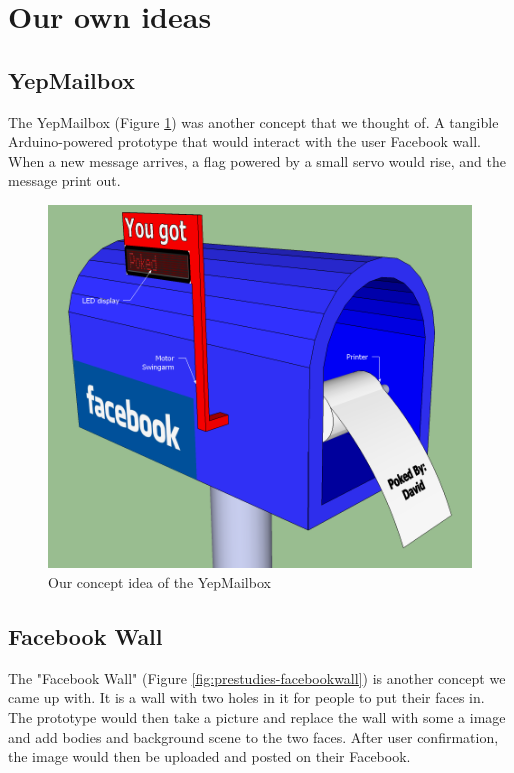 \newpage

\section{Our own ideas}

\subsection{YepMailbox}
The YepMailbox (Figure \ref{fig:prestudies-YepMailbox}) was another concept that we thought of. A tangible Arduino-powered prototype 
that would interact with the user Facebook wall. When a new message arrives, a flag powered by a small servo would rise, and the message print out.

\begin{figure}[h!]
\centering \includegraphics[scale=0.4]{img/prestudies-YepMailbox}
\caption{Our concept idea of the YepMailbox}
\label{fig:prestudies-YepMailbox}
\end{figure}

\newpage

\subsection{Facebook Wall}
The "Facebook Wall" (Figure \ref{fig:prestudies-facebookwall}) is another concept we came up with. It is a wall with two holes in it for people to put their faces in.
The prototype would then take a picture and replace the wall with some a image and add bodies and background scene to the two faces. After user confirmation, the image 
would then be uploaded and posted on their Facebook.

